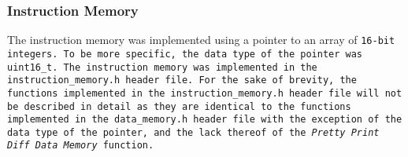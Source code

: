 \documentclass[a4paper,12pt]{article}
\begin{document}
		\subsubsection{Instruction Memory}
			\par{
				The instruction memory was implemented using a pointer to an array of
				\tt{16-bit} integers. To be more specific, the data type of the pointer
				was \tt{uint16\_t}. The instruction memory was implemented in the
				\tt{instruction\_memory.h} header file. For the sake of brevity, the
				functions implemented in the \tt{instruction\_memory.h} header file
				will not be described in detail as they are identical to the functions
				implemented in the \tt{data\_memory.h} header file with the exception
				of the data type of the pointer, and the lack thereof of the
				\emph{Pretty Print Diff Data Memory} function.
			}
\end{document}
